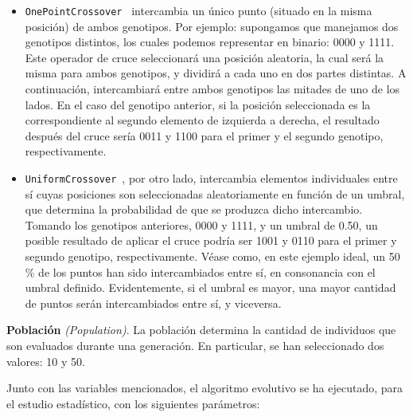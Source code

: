 \begin{itemize}
    \item \texttt{OnePointCrossover}~\cite{eiben_422_2003} intercambia un único punto (situado en la misma posición) de ambos genotipos. Por ejemplo: supongamos que manejamos dos genotipos distintos, los cuales podemos representar en binario: 0000 y 1111. Este operador de cruce seleccionará una posición aleatoria, la cual será la misma para ambos genotipos, y dividirá a cada uno en dos partes distintas. A continuación, intercambiará entre ambos genotipos las mitades de uno de los lados. En el caso del genotipo anterior, si la posición seleccionada es la correspondiente al segundo elemento de izquierda a derecha, el resultado después del cruce sería 0011 y 1100 para el primer y el segundo genotipo, respectivamente.
    \item \texttt{UniformCrossover}~\cite{eiben_422_2003}, por otro lado, intercambia elementos individuales entre sí cuyas posiciones son seleccionadas aleatoriamente en función de un umbral, que determina la probabilidad de que se produzca dicho intercambio. Tomando los genotipos anteriores, 0000 y 1111, y un umbral de 0.50, un posible resultado de aplicar el cruce podría ser 1001 y 0110 para el primer y segundo genotipo, respectivamente. Véase como, en este ejemplo ideal, un 50 \% de los puntos han sido intercambiados entre sí, en consonancia con el umbral definido. Evidentemente, si el umbral es mayor, una mayor cantidad de puntos serán intercambiados entre sí, y viceversa.
\end{itemize}

\textbf{Población} \textit{(Population)}. La población determina la cantidad de individuos que son evaluados durante una generación. En particular, se han seleccionado dos valores: 10 y 50.

Junto con las variables mencionados, el algoritmo evolutivo se ha ejecutado, para el estudio estadístico, con los siguientes parámetros:

